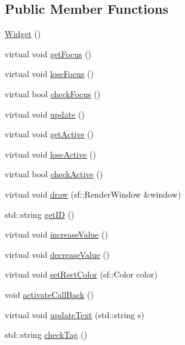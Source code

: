 \subsection*{Public Member Functions}
\begin{DoxyCompactItemize}
\item 
\mbox{\hyperlink{class_widget_ab0f05949f1fa8ca233137fc4119c7401}{Widget}} ()
\item 
virtual void \mbox{\hyperlink{class_widget_a546c3b96bd793596c4902b4df0c41272}{get\+Focus}} ()
\item 
virtual void \mbox{\hyperlink{class_widget_a038576de7f1adf6b29f3ebfd3515f13f}{lose\+Focus}} ()
\item 
virtual bool \mbox{\hyperlink{class_widget_ac8121758d9fcfedb4ff119abeb7d0652}{check\+Focus}} ()
\item 
virtual void \mbox{\hyperlink{class_widget_a38aacc92bda1a1e91052873a4a955487}{update}} ()
\item 
virtual void \mbox{\hyperlink{class_widget_a255e13ebf55d19f93a37b7a1aec9a87f}{get\+Active}} ()
\item 
virtual void \mbox{\hyperlink{class_widget_a8d15d94eb8e41a82e9c4c0ee70a449b6}{lose\+Active}} ()
\item 
virtual bool \mbox{\hyperlink{class_widget_ac87a7f54a06b9a2329884175f6a9c837}{check\+Active}} ()
\item 
virtual void \mbox{\hyperlink{class_widget_ae33a60123dee736ad8ece7277711f3d4}{draw}} (sf\+::\+Render\+Window \&window)
\item 
std\+::string \mbox{\hyperlink{class_widget_aa7145e34616230d24adbf8bf9f8194e2}{get\+ID}} ()
\item 
virtual void \mbox{\hyperlink{class_widget_a4d4df2961aeaa579ef511a546e6276c5}{increase\+Value}} ()
\item 
virtual void \mbox{\hyperlink{class_widget_a1e265a65e224ff231f98dfd490c08c3c}{decrease\+Value}} ()
\item 
virtual void \mbox{\hyperlink{class_widget_a44295ab8e8a07e8206790dd6b317d2fe}{set\+Rect\+Color}} (sf\+::\+Color color)
\item 
void \mbox{\hyperlink{class_widget_a9133f09cce2bcc645d23f36599c180f3}{activate\+Call\+Back}} ()
\item 
virtual void \mbox{\hyperlink{class_widget_ad8d574eab88c94919dc01a33703066b3}{update\+Text}} (std\+::string s)
\item 
std\+::string \mbox{\hyperlink{class_widget_aea8a06cb0344180c07346dbad25a8fdf}{check\+Tag}} ()
\item 

\end{DoxyCompactItemize}
